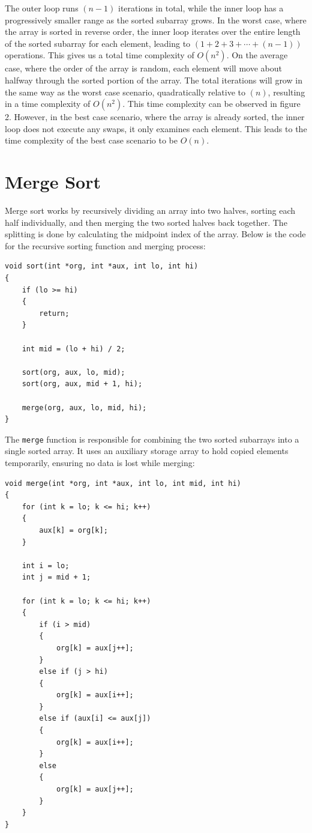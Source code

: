 \documentclass[a4paper,11pt]{article}
\begin{document}
The outer loop runs $(n - 1)$ iterations in total, while the inner loop has a progressively smaller range
as the sorted subarray grows.
In the worst case, where the array is sorted in reverse order,
the inner loop iterates over the entire length of the sorted subarray for each element,
leading to $(1 + 2 + 3 + \cdots + (n - 1))$ operations.
This gives us a total time complexity of $O(n^2)$.
On the average case, where the order of the array is random, each element will move about halfway through the sorted portion of the array.
The total iterations will grow in the same way as the worst case scenario, quadratically relative to $(n)$,
resulting in a time complexity of $O(n^2)$.
This time complexity can be observed in figure 2.
However, in the best case scenario, where the array is already sorted, the inner loop does not execute any swaps,
it only examines each element.
This leads to the time complexity of the best case scenario to be $O(n)$.

\section*{Merge Sort}

Merge sort works by recursively dividing an array into two halves, sorting each half individually,
and then merging the two sorted halves back together.
The splitting is done by calculating the midpoint index of the array.
Below is the code for the recursive sorting function and merging process:

\begin{verbatim}
void sort(int *org, int *aux, int lo, int hi)
{
    if (lo >= hi)
    {
        return;
    }

    int mid = (lo + hi) / 2;

    sort(org, aux, lo, mid);
    sort(org, aux, mid + 1, hi);

    merge(org, aux, lo, mid, hi);
}
\end{verbatim}

The \texttt{merge} function is responsible for combining the two sorted subarrays into a single sorted array.
It uses an auxiliary storage array to hold copied elements temporarily, ensuring no data is lost while merging:

\begin{verbatim}
void merge(int *org, int *aux, int lo, int mid, int hi)
{
    for (int k = lo; k <= hi; k++)
    {
        aux[k] = org[k];
    }

    int i = lo;
    int j = mid + 1;

    for (int k = lo; k <= hi; k++)
    {
        if (i > mid)
        {
            org[k] = aux[j++];
        }
        else if (j > hi)
        {
            org[k] = aux[i++];
        }
        else if (aux[i] <= aux[j])
        {
            org[k] = aux[i++];
        }
        else
        {
            org[k] = aux[j++];
        }
    }
}
\end{verbatim}
\end{document}
